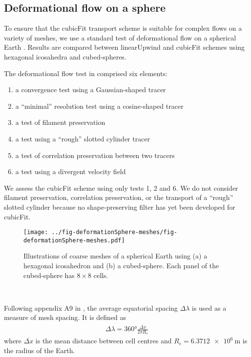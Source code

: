 \subsection{Deformational flow on a sphere}
To ensure that the cubicFit transport scheme is suitable for complex flows on a variety of meshes, we use a standard test of deformational flow on a spherical Earth \citep{lauritzen2012}.  
Results are compared between linearUpwind and cubicFit schemes using hexagonal icosahedra and cubed-spheres.

The deformational flow test in \citep{lauritzen2012} comprised six elements:
\begin{enumerate}
\item a convergence test using a Gaussian-shaped tracer
\item a ``minimal'' resolution test using a cosine-shaped tracer
\item a test of filament preservation
\item a test using a ``rough'' slotted cylinder tracer
\item a test of correlation preservation between two tracers
\item a test using a divergent velocity field
\end{enumerate}
We assess the cubicFit scheme using only tests 1, 2 and 6.  We do not consider filament preservation, correlation preservation, or the transport of a ``rough'' slotted cylinder because no shape-preserving filter has yet been developed for cubicFit.

\begin{figure}
	\centering
	\texttt{[image: ../fig-deformationSphere-meshes/fig-deformationSphere-meshes.pdf]}
	\caption{Illustrations of coarse meshes of a spherical Earth using (a) a hexagonal icosahedron and (b) a cubed-sphere.    Each panel of the cubed-sphere has $8 \times 8$ cells.}
	\label{fig:sphere-meshes}
\end{figure}

 \\

Following appendix A9 in \citep{lauritzen2014}, the average equatorial spacing $\Delta \lambda$ is used as a measure of mesh spacing.  It is defined as
\begin{align}
	\Delta \lambda = \ang{360} \frac{\overline{\Delta x}}{2 \pi R_e}
\end{align}
where $\overline{\Delta x}$ is the mean distance between cell centres and $R_e = \SI{6.3712e6}{\meter}$ is the radius of the Earth.


